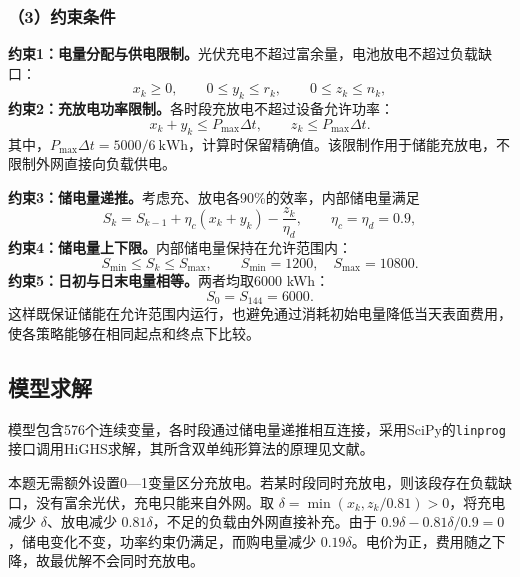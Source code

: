 \subsubsection*{（3）约束条件}
\noindent\textbf{约束1：电量分配与供电限制。}光伏充电不超过富余量，电池放电不超过负载缺口：
\begin{equation}
x_k\ge0,\qquad 0\le y_k\le r_k,\qquad 0\le z_k\le n_k,
\label{eq:q1_supply_constraint}
\end{equation}
\noindent\textbf{约束2：充放电功率限制。}各时段充放电不超过设备允许功率：
\begin{equation}
x_k+y_k\le P_{\max}\Delta t,\qquad z_k\le P_{\max}\Delta t.
\label{eq:q1_power_constraint}
\end{equation}
其中，$P_{\max}\Delta t=5000/6\ \mathrm{kWh}$，计算时保留精确值。该限制作用于储能充放电，不限制外网直接向负载供电。

\noindent\textbf{约束3：储电量递推。}考虑充、放电各90\%的效率，内部储电量满足
\begin{equation}
S_k=S_{k-1}+\eta_c(x_k+y_k)-\frac{z_k}{\eta_d},\qquad \eta_c=\eta_d=0.9,
\label{eq:q1_soc_transition}
\end{equation}
\noindent\textbf{约束4：储电量上下限。}内部储电量保持在允许范围内：
\begin{equation}
S_{\min}\le S_k\le S_{\max},\qquad S_{\min}=1200,\quad S_{\max}=10800.
\label{eq:q1_soc_bound}
\end{equation}
\noindent\textbf{约束5：日初与日末电量相等。}两者均取6000 kWh：
\begin{equation}
S_0=S_{144}=6000.
\label{eq:q1_terminal_constraint}
\end{equation}
这样既保证储能在允许范围内运行，也避免通过消耗初始电量降低当天表面费用，使各策略能够在相同起点和终点下比较。

\subsection{模型求解}
模型包含576个连续变量，各时段通过储电量递推相互连接，采用SciPy\cite{virtanen}的\texttt{linprog}接口调用HiGHS求解，其所含双单纯形算法的原理见文献\cite{huangfu}。

本题无需额外设置0—1变量区分充放电。若某时段同时充放电，则该段存在负载缺口，没有富余光伏，充电只能来自外网。取 $\delta=\min(x_k,z_k/0.81)>0$，将充电减少 $\delta$、放电减少 $0.81\delta$，不足的负载由外网直接补充。由于 $0.9\delta-0.81\delta/0.9=0$，储电变化不变，功率约束仍满足，而购电量减少 $0.19\delta$。电价为正，费用随之下降，故最优解不会同时充放电。

